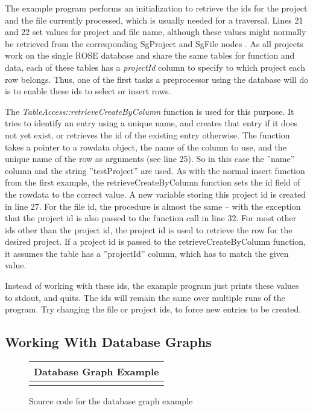 The example program performs an initialization to retrieve the ids for the 
project and the file currently processed, which is usually needed for 
a traversal. Lines 21 and 22 set values for project and file name, although
these values might normally be retrieved from the corresponding SgProject
and SgFile nodes . As all projects work on 
the single ROSE database and share the same tables for function and
data, each of these tables has a \emph{projectId} column to specify to which 
project each row belongs. Thus, one of the first tasks a preprocessor using the
database will do is to enable these ids to select or insert rows.

The \emph{TableAccess::retrieveCreateByColumn} function is used for this purpose.
It tries to identify an entry using a unique name, and creates that entry
if it does not yet exist, or retrieves the id of the existing entry otherwise. 
The function takes a pointer to a rowdata object, the name of the column to use,
and the unique name of the row as arguments (see line 25). So in this case
the ''name'' column and the string ''testProject'' are used. As with the 
normal insert function from the first example, the retrieveCreateByColumn function
sets the id field of the rowdata to the correct value. A new variable storing
this project id is created in line 27. For the file id, the procedure is almost
the same -- with the exception that the project id is also passed to the
function call in line 32. For most other ids other than the project id,
the project id is used to retrieve the row for the desired project. If 
a project id is passed to the retrieveCreateByColumn function, it assumes 
the table has a ''projectId'' column, which has to match the given value.

Instead of working with these ids, the example program just prints these
values to stdout, and quits. The ids will remain the same over multiple runs
of the program. Try changing the file or project ids, to force new entries
to be created.


\subsection{Working With Database Graphs}
\label{sec:TutDB:DBGraphs}

\begin{latexonly} 
\begin{figure}[tb] 
\begin{center} 
\begin{tabular}{|c|} \hline
    	Database Graph Example
\\\hline\hline

\\\hline
\end{tabular} \end{center}
\caption{ \label{fig:TutDB:DatabaseGraph} Source code for the database graph example }
\end{figure} 
\end{latexonly}

